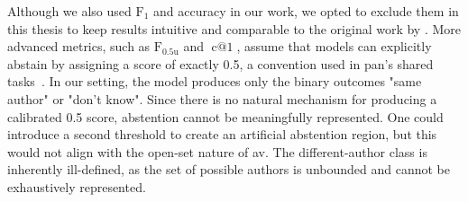 
Although we also used $\operatorname{F_{1}}$ and accuracy in our work, we opted to exclude them in this thesis to keep results intuitive and comparable to the original work by \citet{koppel_determining_2014}.
More advanced metrics, such as $\operatorname{F_{0.5u}}$ and $\operatorname{c@1}$, assume that models can explicitly abstain by assigning a score of exactly 0.5, a convention used in \acs{pan}'s shared tasks~\citep{tyo_state_2022,bevendorff_overview_2024,kocher_unine_2015}. 
In our setting, the model produces only the binary outcomes "same author" or "don't know". 
Since there is no natural mechanism for producing a calibrated 0.5 score, abstention cannot be meaningfully represented. 
One could introduce a second threshold to create an artificial abstention region, but this would not align with the open-set nature of \ac{av}. 
The different-author class is inherently ill-defined, as the set of possible authors is unbounded and cannot be exhaustively represented. 

